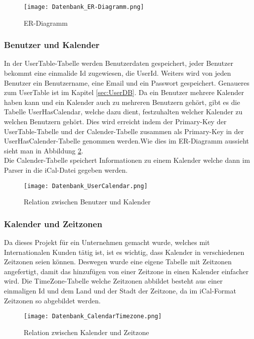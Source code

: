 \begin{figure}[H]
	\texttt{[image: Datenbank\_ER-Diagramm.png]}
    \caption{ER-Diagramm}
    \label{fig:erDiagramm}
\end{figure}

\subsubsection*{Benutzer und Kalender}
\label{ref:benutzerKalender}
In der UserTable-Tabelle werden Benutzerdaten gespeichert, jeder Benutzer bekommt eine einmalide Id zugewiesen, die UserId. Weiters wird von jeden Benutzer ein Benutzername, eine Email und ein Passwort gespeichert. Genaueres zum UserTable ist im Kapitel \ref{sec:UserDB}. Da ein Benutzer mehrere Kalender haben kann und ein Kalender auch zu mehreren Benutzern gehört, gibt es die Tabelle UserHasCalendar, welche dazu dient, festzuhalten welcher Kalender zu welchen Benutzern gehört. Dies wird erreicht indem der Primary-Key der UserTable-Tabelle und der Calender-Tabelle zusammen als Primary-Key in der UserHasCalender-Tabelle genommen werden.Wie dies im ER-Diagramm aussieht sieht man in Abbildung \ref{fig:userCalender}.\\
Die Calender-Tabelle speichert Informationen zu einem Kalender welche dann im Parser in die iCal-Datei gegeben werden.
\begin{figure}[H]
	\texttt{[image: Datenbank\_UserCalendar.png]}
    \caption{Relation zwischen Benutzer und Kalender}
    \label{fig:userCalender}
\end{figure}

\subsubsection*{Kalender und Zeitzonen}
\label{ref:kalenderZeitzonen}
Da dieses Projekt für ein Unternehmen gemacht wurde, welches mit Internationalen Kunden tätig ist, ist es wichtig, dass Kalender in verschiedenen Zeitzonen seien können. Deswegen wurde eine eigene Tabelle mit Zeitzonen angefertigt, damit das hinzufügen von einer Zeitzone in einen Kalender einfacher wird. Die TimeZone-Tabelle welche Zeitzonen abbildet besteht aus einer einmaligen Id und dem Land und der Stadt der Zeitzone, da im iCal-Format Zeitzonen so abgebildet werden. 
\begin{figure}[H]
	\texttt{[image: Datenbank\_CalendarTimezone.png]}
    \caption{Relation zwischen Kalender und Zeitzone}
    \label{fig:timezoneCalender}
\end{figure}

